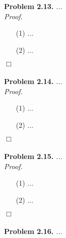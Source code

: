 \documentclass{article}
\begin{document}



\textbf{Problem 2.13.}
\emph{...} \\



\emph{Proof.}
\begin{enumerate}
\item[(1)]
  ...

\item[(2)]
  ...
\end{enumerate}
$\Box$ \\\\






\textbf{Problem 2.14.}
\emph{...} \\



\emph{Proof.}
\begin{enumerate}
\item[(1)]
  ...

\item[(2)]
  ...
\end{enumerate}
$\Box$ \\\\






\textbf{Problem 2.15.}
\emph{...} \\



\emph{Proof.}
\begin{enumerate}
\item[(1)]
  ...

\item[(2)]
  ...
\end{enumerate}
$\Box$ \\\\






\textbf{Problem 2.16.}
\emph{...} \\
\end{document}
